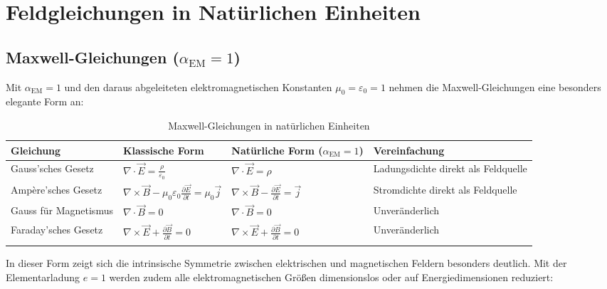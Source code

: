 \documentclass[12pt,a4paper]{article}
\newcommand{\alphaEM}{\alpha_{\text{EM}}}
\begin{document}
	\section{Feldgleichungen in Natürlichen Einheiten}
	
	\subsection{Maxwell-Gleichungen ($\alphaEM = 1$)}
	
	Mit $\alphaEM = 1$ und den daraus abgeleiteten elektromagnetischen Konstanten $\mu_0 = \varepsilon_0 = 1$ nehmen die Maxwell-Gleichungen eine besonders elegante Form an:
	
	\begin{table}[ht]
		\centering
		\begin{adjustbox}{scale=0.75}
			\begin{tabular}{llll}
				\hline
				\textbf{Gleichung} & \textbf{Klassische Form} & \textbf{Natürliche Form ($\alphaEM = 1$)} & \textbf{Vereinfachung} \\
				\hline
				Gauss'sches Gesetz & $\nabla\cdot\vec{E} = \frac{\rho}{\varepsilon_0}$ & $\nabla\cdot\vec{E} = \rho$ & Ladungsdichte direkt als Feldquelle \\
				Ampère'sches Gesetz & $\nabla\times\vec{B} - \mu_0\varepsilon_0\frac{\partial\vec{E}}{\partial t} = \mu_0\vec{j}$ & $\nabla\times\vec{B} - \frac{\partial\vec{E}}{\partial t} = \vec{j}$ & Stromdichte direkt als Feldquelle \\
				Gauss für Magnetismus & $\nabla\cdot\vec{B} = 0$ & $\nabla\cdot\vec{B} = 0$ & Unveränderlich \\
				Faraday'sches Gesetz & $\nabla\times\vec{E} + \frac{\partial\vec{B}}{\partial t} = 0$ & $\nabla\times\vec{E} + \frac{\partial\vec{B}}{\partial t} = 0$ & Unveränderlich \\
				\hline
			\multicolumn{3}{c}{} \\
				\hline
			\end{tabular}
		\end{adjustbox}
		\caption{Maxwell-Gleichungen in natürlichen Einheiten }
		\label{tab:maxwell}
	\end{table}
	
	In dieser Form zeigt sich die intrinsische Symmetrie zwischen elektrischen und magnetischen Feldern besonders deutlich. Mit der Elementarladung $e = 1$ werden zudem alle elektromagnetischen Größen dimensionslos oder auf Energiedimensionen reduziert:
	
\end{document}
